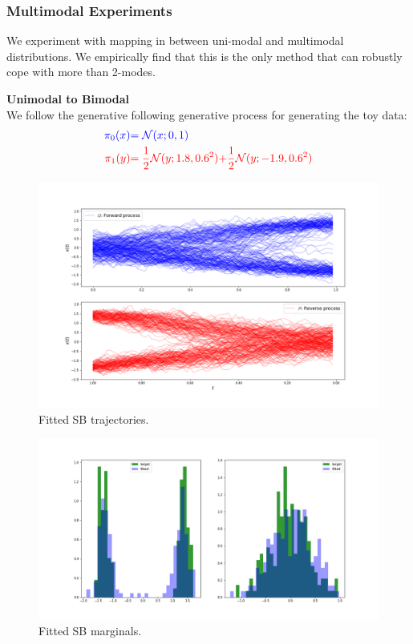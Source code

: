 \documentclass[a4paper,12pt,twoside,openright]{report}
\theoremstyle{definition}
\begin{document}
\subsubsection{Multimodal Experiments}

We experiment with mapping in between uni-modal and multimodal distributions. We empirically find that this is the only method that can robustly cope with more than 2-modes.

\textbf{Unimodal to Bimodal}\\

We follow the generative following generative process for generating the toy data:
\begin{align*}
     \color{blue}{\pi_0(x)} &\color{blue}{= {\mathcal{N}}(x; 0,  1)} \\
    \color{red}{\pi_1(y)} &\color{red}{= \frac{1}{2}{\mathcal{N}}(y; 1.8, 0.6 ^2)}\color{red}{ + \frac{1}{2}{\mathcal{N}}(y; -1.9, 0.6 ^2) }
\end{align*}
\begin{figure}
    \centering
    \includegraphics[scale=0.4,trim={3.5cm 1cm 2.5cm 0}, clip]{images/GP/gp_final_bimodal_trajectories.png}
    \caption{ Fitted SB trajectories.  }
    \label{fig:bimodfinal200trajectroies}
\end{figure}
\begin{figure}
    \centering
    \includegraphics[scale=0.3,trim={4cm 1cm 2.5cm 0}, clip]{images/GP/gp_2_mode_final_boundaires.png}
    \caption{ Fitted SB marginals.  }
    \label{fig:bimodfinal200boundaries}
\end{figure}
\end{document}
